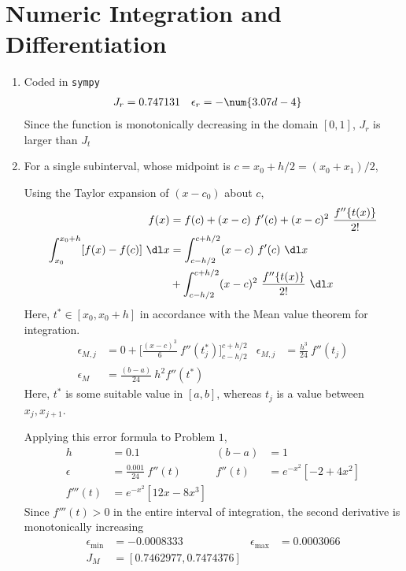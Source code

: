 \section{Numeric Integration and Differentiation}

\begin{enumerate}
    \item Coded in \texttt{sympy}
          \begin{align}
              J_r & = 0.747131 & \epsilon_r & = -\num{3.07d-4}
          \end{align}
          Since the function is monotonically decreasing in the domain $ [0,1] $,
          $ J_r $ is larger than $ J_t $

    \item For a single subinterval, whose midpoint is $ c = x_0 + h/2 = (x_0 + x_1)/2 $,

          Using the Taylor expansion of $ (x - c_0) $ about $ c $,
          \begin{align}
              f(x) & = f(c) + (x-c)\ f'(c) + (x-c)^2\ \frac{f''\{t(x)\}}{2!}       \\
              \int_{x_0}^{x_0+h} [f(x) - f(c)]\ \dl x
                   & = \int_{c-h/2}^{c+h/2} (x-c)\ f'(c)\ \dl x                    \\
                   & + \int_{c-h/2}^{c+h/2} (x-c)^2\ \frac{f''\{t(x)\}}{2!}\ \dl x
          \end{align}
          Here, $ t^* \in [x_0, x_0 + h] $ in accordance with the Mean value theorem for
          integration.
          \begin{align}
              \epsilon_{M,j}         & = 0 + \Bigg[\frac{(x-c)^3}{6}\ f''(t_j^*)
              \Bigg]_{c-h/2}^{c+h/2} &
              \epsilon_{M,j}         & = \frac{h^3}{24}\ f''(t_j)                \\
              \epsilon_M             & = \frac{(b-a)}{24}\ h^2f''(t^*)
          \end{align}
          Here, $ t^* $ is some suitable value in $ [a, b] $, whereas $ t_j $ is a
          value between $ x_j, x_{j+1} $. \par
          Applying this error formula to Problem $ 1 $,
          \begin{align}
              h        & = 0.1
                       & (b-a)                      & = 1 \\
              \epsilon & = \frac{0.001}{24}\ f''(t) &
              f''(t)   & = e^{-x^2} [-2 + 4x^2]           \\
              f'''(t)  & = e^{-x^2} [12x - 8x^3]
          \end{align}
          Since $ f'''(t) > 0 $ in the entire interval of integration, the second
          derivative is monotonically increasing
          \begin{align}
              \epsilon_{\text{min}} & = -0.0008333             &
              \epsilon_{\text{max}} & = 0.0003066                \\
              J_M                   & = [0.7462977, 0.7474376]
          \end{align}


\end{enumerate}
